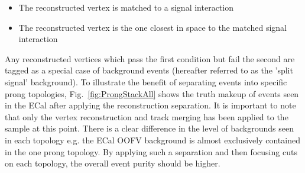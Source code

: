 \begin{itemize}
  \item The reconstructed vertex is matched to a signal interaction
  \item The reconstructed vertex is the one closest in space to the matched signal interaction
\end{itemize}
Any reconstructed vertices which pass the first condition but fail the second are tagged as a special case of background events (hereafter referred to as the 'split signal' background).
\newline
\newline
To illustrate the benefit of separating events into specific prong topologies, Fig.~\ref{fig:ProngStackAll} shows the truth makeup of events seen in the ECal after applying the reconstruction separation.  It is important to note that only the vertex reconstruction and track merging has been applied to the sample at this point.  There is a clear difference in the level of backgrounds seen in each topology e.g. the ECal OOFV background is almost exclusively contained in the one prong topology.  By applying such a separation and then focusing cuts on each topology, the overall event purity should be higher. 
